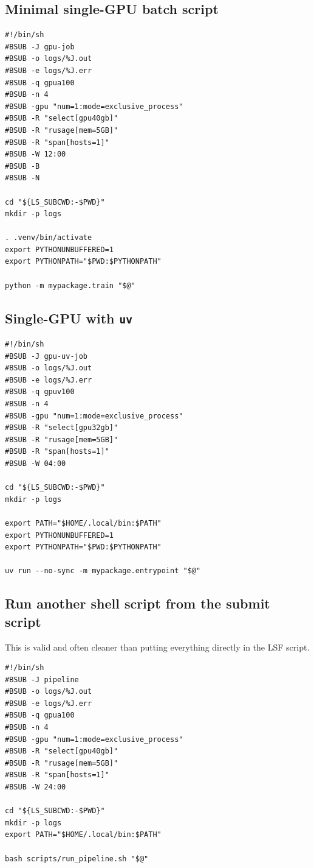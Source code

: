 \documentclass[11pt,a4paper]{article}
\begin{document}
\subsection{Minimal single-GPU batch script}

\begin{lstlisting}[style=shell]
#!/bin/sh
#BSUB -J gpu-job
#BSUB -o logs/%J.out
#BSUB -e logs/%J.err
#BSUB -q gpua100
#BSUB -n 4
#BSUB -gpu "num=1:mode=exclusive_process"
#BSUB -R "select[gpu40gb]"
#BSUB -R "rusage[mem=5GB]"
#BSUB -R "span[hosts=1]"
#BSUB -W 12:00
#BSUB -B
#BSUB -N

cd "${LS_SUBCWD:-$PWD}"
mkdir -p logs

. .venv/bin/activate
export PYTHONUNBUFFERED=1
export PYTHONPATH="$PWD:$PYTHONPATH"

python -m mypackage.train "$@"
\end{lstlisting}

\subsection{Single-GPU with \texttt{uv}}

\begin{lstlisting}[style=shell]
#!/bin/sh
#BSUB -J gpu-uv-job
#BSUB -o logs/%J.out
#BSUB -e logs/%J.err
#BSUB -q gpuv100
#BSUB -n 4
#BSUB -gpu "num=1:mode=exclusive_process"
#BSUB -R "select[gpu32gb]"
#BSUB -R "rusage[mem=5GB]"
#BSUB -R "span[hosts=1]"
#BSUB -W 04:00

cd "${LS_SUBCWD:-$PWD}"
mkdir -p logs

export PATH="$HOME/.local/bin:$PATH"
export PYTHONUNBUFFERED=1
export PYTHONPATH="$PWD:$PYTHONPATH"

uv run --no-sync -m mypackage.entrypoint "$@"
\end{lstlisting}

\subsection{Run another shell script from the submit script}

This is valid and often cleaner than putting everything directly in the LSF script.

\begin{lstlisting}[style=shell]
#!/bin/sh
#BSUB -J pipeline
#BSUB -o logs/%J.out
#BSUB -e logs/%J.err
#BSUB -q gpua100
#BSUB -n 4
#BSUB -gpu "num=1:mode=exclusive_process"
#BSUB -R "select[gpu40gb]"
#BSUB -R "rusage[mem=5GB]"
#BSUB -R "span[hosts=1]"
#BSUB -W 24:00

cd "${LS_SUBCWD:-$PWD}"
mkdir -p logs
export PATH="$HOME/.local/bin:$PATH"

bash scripts/run_pipeline.sh "$@"
\end{lstlisting}
\end{document}
